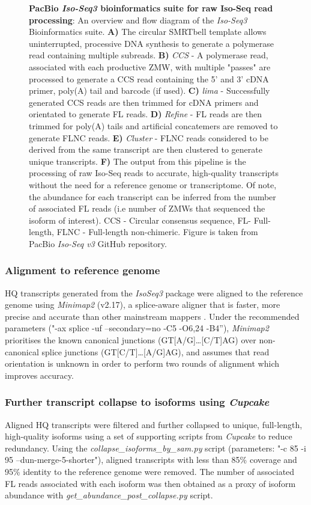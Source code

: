 \begin{figure}[htp]
	{\textbf{PacBio \textit{Iso-Seq3} bioinformatics suite for raw Iso-Seq read processing}: An overview and flow diagram of the \textit{Iso-Seq3} Bioinformatics suite. \textbf{A)} The circular SMRTbell template allows uninterrupted, processive DNA synthesis to generate a polymerase read containing multiple subreads. \textbf{B)} \textit{CCS} - A polymerase read, associated with each productive ZMW, with multiple "passes" are processed to generate a CCS read containing the 5' and 3' cDNA primer, poly(A) tail and barcode (if used). \textbf{C)} \textit{lima} - Successfully generated CCS reads are then trimmed for cDNA primers and orientated to generate FL reads. \textbf{D)} \textit{Refine} - FL reads are then trimmed for poly(A) tails and artificial concatemers are removed to generate FLNC reads. \textbf{E)} \textit{Cluster} - FLNC reads considered to be derived from the same transcript are then clustered to generate unique transcripts. \textbf{F)} The output from this pipeline is the processing of raw Iso-Seq reads to accurate, high-quality transcripts without the need for a reference genome or transcriptome. Of note, the abundance for each transcript can be inferred from the number of associated FL reads (i.e number of ZMWs that sequenced the isoform of interest). CCS - Circular consensus sequence, FL- Full-length, FLNC - Full-length non-chimeric. Figure is taken from PacBio \textit{Iso-Seq v3} GitHub repository\cite{githubp}.}
	\label{fig:isoseq3_tool}
\end{figure}

\newpage
\subsubsection{Alignment to reference genome} 
HQ transcripts generated from the \textit{IsoSeq3} package were aligned to the reference genome using \textit{Minimap2}\cite{Li2018} (v2.17), a splice-aware aligner that is faster, more precise and accurate than other mainstream mappers \cite{SimirKriZanoviC2018,Tang2020}. Under the recommended parameters ("-ax splice -uf --secondary=no -C5 -O6,24 -B4”), \textit{Minimap2} prioritises the known canonical junctions (GT[A/G]…[C/T]AG) over non-canonical splice junctions (GT[C/T]…[A/G]AG), and assumes that read orientation is unknown in order to perform two rounds of alignment which improves accuracy. 

\subsubsection{Further transcript collapse to isoforms using \textit{Cupcake}}
Aligned HQ transcripts were filtered and further collapsed to unique, full-length, high-quality isoforms using a set of supporting scripts from \textit{Cupcake} to reduce redundancy. Using the \textit{collapse\_isoforms\_by\_sam.py} script (parameters: "-c 85 -i 95 --dun-merge-5-shorter"), aligned transcripts with less than 85\% coverage and 95\% identity to the reference genome were removed. The number of associated FL reads associated with each isoform was then obtained as a proxy of isoform abundance with \textit{get\_abundance\_post\_collapse.py} script. 

